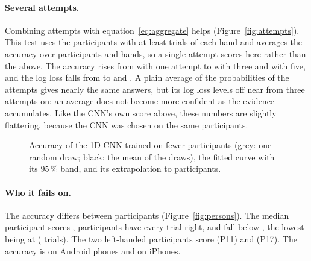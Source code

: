 \paragraph{Several attempts.} Combining attempts with equation~\eqref{eq:aggregate} helps (Figure~\ref{fig:attempts}).
This test uses the  participants with at least  trials of each hand and
averages the accuracy over participants and hands, so a single attempt scores  here rather
than the  above. The accuracy rises from  with one attempt to
 with three and  with five, and the log loss falls from
 to  and . A plain average of the
probabilities of the attempts gives nearly the same answers, but its log loss levels off near
 from three attempts on: an average does not become more confident as the evidence
accumulates. Like the CNN's own score above, these numbers are slightly flattering, because the CNN was chosen on the
same participants.

\begin{figure}[tbp]
\centering
\begin{minipage}[t]{0.49\linewidth}\centering
  \caption{Accuracy of the final model for each participant when that participant was left out, sorted; dark bars:
  Android, hatched: iPhone; L: the two left-handed participants; dashed: .}
  \label{fig:persons}
\end{minipage}\hfill
\begin{minipage}[t]{0.49\linewidth}\centering
  \caption{Accuracy of the 1D CNN trained on fewer participants (grey: one random draw; black: the mean of the
  draws), the fitted curve with its 95\,\% band, and its extrapolation to 
  participants.}
  \label{fig:learning}
\end{minipage}
\end{figure}

\paragraph{Who it fails on.} The accuracy differs between participants (Figure~\ref{fig:persons}). The median
participant scores ,  participants have every trial right, and
 fall below , the lowest being  at
 ( trials). The two left-handed participants score
 (P11) and  (P17). The accuracy is  on Android
phones and  on iPhones.

